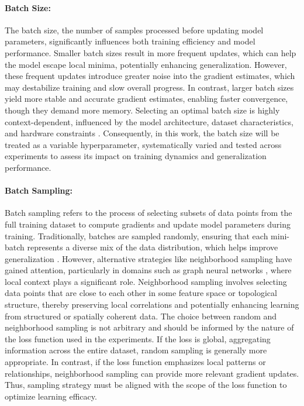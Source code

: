 \paragraph{Batch Size:} The batch size, the number of samples processed before updating model parameters, significantly influences both training efficiency and model performance. Smaller batch sizes result in more frequent updates, which can help the model escape local minima, potentially enhancing generalization. However, these frequent updates introduce greater noise into the gradient estimates, which may destabilize training and slow overall progress. In contrast, larger batch sizes yield more stable and accurate gradient estimates, enabling faster convergence, though they demand more memory. Selecting an optimal batch size is highly context-dependent, influenced by the model architecture, dataset characteristics, and hardware constraints \cite{Berahmand24}. Consequently, in this work, the batch size will be treated as a variable hyperparameter, systematically varied and tested across experiments to assess its impact on training dynamics and generalization performance.

\paragraph{Batch Sampling:} Batch sampling refers to the process of selecting subsets of data points from the full training dataset to compute gradients and update model parameters during training. Traditionally, batches are sampled randomly, ensuring that each mini-batch represents a diverse mix of the data distribution, which helps improve generalization \cite{LeCun12}. However, alternative strategies like neighborhood sampling have gained attention, particularly in domains such as graph neural networks \cite{Hamilton18}, where local context plays a significant role. Neighborhood sampling involves selecting data points that are close to each other in some feature space or topological structure, thereby preserving local correlations and potentially enhancing learning from structured or spatially coherent data. The choice between random and neighborhood sampling is not arbitrary and should be informed by the nature of the loss function used in the experiments. If the loss is global, aggregating information across the entire dataset, random sampling is generally more appropriate. In contrast, if the loss function emphasizes local patterns or relationships, neighborhood sampling can provide more relevant gradient updates. Thus, sampling strategy must be aligned with the scope of the loss function to optimize learning efficacy.

